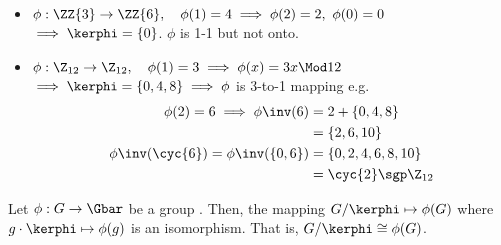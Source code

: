   \begin{examples}
      \begin{itemize}
          \item \(\phi:\ZZ{3}\to\ZZ{6}, \quad\phi(1) = 4 \implies \phi(2)=2,\ \phi(0)=0\) \\
          \(\implies\kerphi = \{0\}\). \(\phi\) is 1-1 but not onto.
          \item \(\phi:\Z_{12}\to\Z_{12}, \quad \phi(1)=3 \implies \phi(x)=3x \Mod 12\) \\
          \(\implies \kerphi = \{0, 4, 8\}\implies \phi\) is 3-to-1 mapping
          e.g. \begin{align*}
              \phi(2) = 6\implies \phi\inv(6) &= 2+\{0, 4, 8\} \\
              &= \{2,6,10\} \\
              \phi\inv(\cyc{6}) = \phi\inv(\{0,6\}) &= \{0,2,4,6,8,10\} \\
              &= \cyc{2} \sgp \Z_{12}
          \end{align*}
      \end{itemize}
  \end{examples}


  \begin{theorem}
      Let \(\phi:G\to\Gbar\) be a group \homo. Then, the mapping \(G/\kerphi\mapsto \phi(G)\) where \(g\cdot\kerphi\mapsto \phi(g)\) is an isomorphism. That is, \(G/\kerphi\cong \phi(G)\).
  \end{theorem}